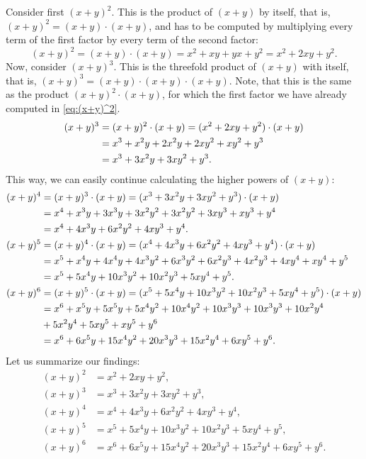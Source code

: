 Consider first $(x+y)^2$. 
This is the product of $(x+y)$ by itself, 
that is, $(x+y)^2 = (x+y)\cdot (x+y)$, 
and has to be computed by multiplying every term of the first factor by every term of the second factor: 
\begin{equation}\label{eq:(x+y)^2}
(x+y)^2 = (x+y) \cdot (x+y) = x^2 + xy + yx + y^2 = x^2 + 2xy + y^2. 
\end{equation}
Now, consider $(x+y)^3$. 
This is the threefold product of $(x+y)$ with itself, 
that is, $(x+y)^3  = (x+y)\cdot (x+y) \cdot (x+y)$. 
Note, that this is the same as the product $(x+y)^2 \cdot (x+y)$, 
for which the first factor we have already computed in \eqref{eq:(x+y)^2}. 
\begin{align}
\notag (x+y)^3 &= (x+y)^2 \cdot (x+y) = (x^2 + 2xy + y^2)\cdot (x+y) \\
\notag &= x^3 + x^2y + 2x^2y + 2xy^2 + xy^2 + y^3 \\
\notag &= x^3 + 3x^2y + 3 xy^2 + y^3. 
\end{align}
This way, we can easily continue calculating the higher powers of $(x+y)$:
\begin{align}
\notag (x+y)^4 &= (x+y)^3 \cdot (x+y) = (x^3 + 3x^2y + 3 xy^2 + y^3)\cdot (x+y) \\
\notag &= x^4 + x^3y + 3x^3y + 3x^2y^2 + 3x^2y^2 + 3xy^3 + xy^3 + y^4 \\
\notag &= x^4 + 4x^3y + 6x^2y^2 + 4xy^3 + y^4. \\
\notag (x+y)^5 &= (x+y)^4 \cdot (x+y) = (x^4 + 4x^3y + 6x^2y^2 + 4xy^3 + y^4)\cdot (x+y) \\
\notag &= x^5 + x^4y + 4x^4y + 4x^3y^2 + 6x^3y^2 + 6x^2y^3 + 4x^2y^3 + 4xy^4 + xy^4 + y^5 \\
\notag &= x^5 + 5x^4y + 10x^3y^2 + 10x^2y^3 + 5xy^4 + y^5. \\
\notag (x+y)^6 &= (x+y)^5 \cdot (x+y) = (x^5 + 5x^4y + 10x^3y^2 + 10x^2y^3 + 5xy^4 + y^5)\cdot (x+y) \\
\notag &= x^6 + x^5y + 5x^5y + 5x^4y^2 + 10x^4y^2 + 10x^3y^3 + 10x^3y^3 + 10x^2y^4 \\
\notag &+ 5x^2y^4 + 5xy^5 + xy^5 + y^6 \\
\notag &= x^6 + 6x^5y + 15x^4y^2 + 20x^3y^3 + 15x^2y^4 + 6xy^5 + y^6. 
\end{align}
Let us summarize our findings: %
\begin{align*}
(x+y)^2 & = x^2 + 2xy + y^2, \\
(x+y)^3 &= x^3 + 3x^2y + 3 xy^2 + y^3, \\
(x+y)^4 &= x^4 + 4x^3y + 6x^2y^2 + 4xy^3 + y^4, \\
(x+y)^5 &= x^5 + 5x^4y + 10x^3y^2 + 10x^2y^3 + 5xy^4 + y^5, \\
(x+y)^6 &= x^6 + 6x^5y + 15x^4y^2 + 20x^3y^3 + 15x^2y^4 + 6xy^5 + y^6. 
\end{align*}

